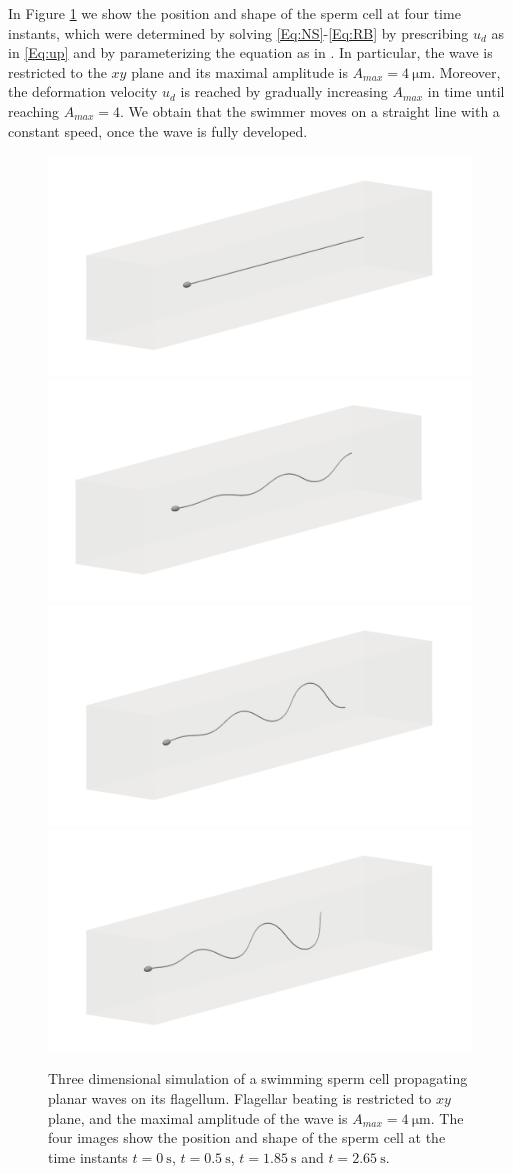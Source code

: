 \documentclass[graybox]{svmult}
\newcommand{\Vel}{u} %
\begin{document}
In Figure \ref{Fig:3dsperm_planar} we show the position and shape of the sperm cell at four time instants, which were determined by solving \eqref{Eq:NS}-\eqref{Eq:RB} by prescribing $u_d$ as in \eqref{Eq:up} and by parameterizing the equation as in \cite{RazaviAhmadi2015}. In particular, the wave is restricted to the $xy$ plane and its maximal amplitude is $A_{max} = \SI{4}{\micro\meter}$. Moreover, the deformation velocity $\Vel_d$ is reached by gradually increasing $A_{max}$ in time until reaching $A_{max}=4$. We obtain that the swimmer moves on a straight line with a constant speed, once the wave is fully developed. 


\begin{figure}
	\centering
	\includegraphics[width=0.45\linewidth]{Figures/3d_sperm_planar/3dswimmer_00.png}
	\includegraphics[width=0.45\linewidth]{Figures/3d_sperm_planar/3dswimmer_0dot5.png}
	\includegraphics[width=0.45\linewidth]{Figures/3d_sperm_planar/3dswimmer_1dot85.png}
	\includegraphics[width=0.45\linewidth]{Figures/3d_sperm_planar/3dswimmer_2dot65.png}
	\caption{Three dimensional simulation of a swimming sperm cell propagating planar waves on its flagellum. Flagellar beating is restricted to $xy$ plane, and the maximal amplitude of the wave is $A_{max}=\SI{4}{\micro\meter}$. The four images show the position and shape of the sperm cell at the time instants $t=\SI{0}{\second}$, $t=\SI{0.5}{\second}$, $t=\SI{1.85}{\second}$ and $t=\SI{2.65}{\second}$. }
	\label{Fig:3dsperm_planar}
\end{figure}
\end{document}

